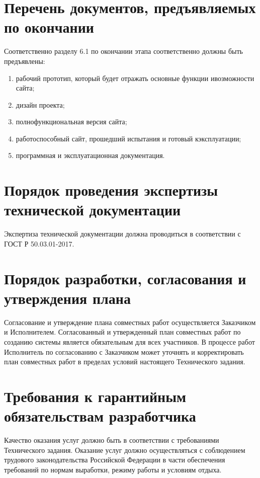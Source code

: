 \section{Перечень документов, предъявляемых по окончании}

Соответственно разделу 6.1 по окончании этапа соответственно
должны быть предъявлены:

\begin{enumerate}
\item рабочий прототип, который будет отражать основные функции ивозможности сайта;
\item дизайн проекта;
\item полнофункциональная версия сайта;
\item работоспособный сайт, прошедший испытания и готовый кэксплуатации;
\item программная и эксплуатационная документация.
\end{enumerate}

\section{Порядок проведения экспертизы технической документации}

Экспертиза технической документации должна проводиться в
соответствии с ГОСТ Р 50.03.01-2017.

\section{Порядок разработки, согласования и утверждения плана}

Согласование и утверждение плана совместных работ осуществляется
Заказчиком и Исполнителем. Согласованный и утвержденный план
совместных работ по созданию системы является обязательным для всех
участников. В процессе работ Исполнитель по согласованию с Заказчиком
может уточнять и корректировать план совместных работ в пределах условий
настоящего Технического задания.

\section{Требования к гарантийным обязательствам разработчика}

Качество оказания услуг должно быть в соответствии с требованиями
Технического задания. Оказание услуг должно осуществляться с соблюдением
трудового законодательства Российской Федерации в части обеспечения
требований по нормам выработки, режиму работы и условиям отдыха.

